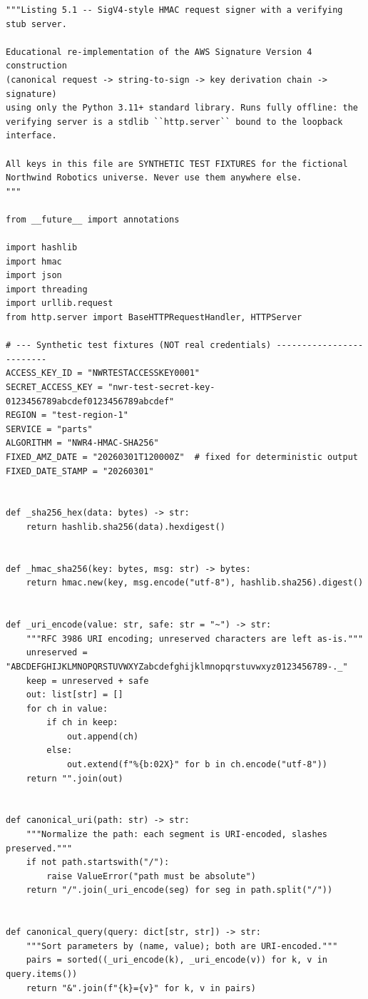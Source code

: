 \begin{verbatim}
"""Listing 5.1 -- SigV4-style HMAC request signer with a verifying stub server.

Educational re-implementation of the AWS Signature Version 4 construction
(canonical request -> string-to-sign -> key derivation chain -> signature)
using only the Python 3.11+ standard library. Runs fully offline: the
verifying server is a stdlib ``http.server`` bound to the loopback
interface.

All keys in this file are SYNTHETIC TEST FIXTURES for the fictional
Northwind Robotics universe. Never use them anywhere else.
"""

from __future__ import annotations

import hashlib
import hmac
import json
import threading
import urllib.request
from http.server import BaseHTTPRequestHandler, HTTPServer

# --- Synthetic test fixtures (NOT real credentials) -------------------------
ACCESS_KEY_ID = "NWRTESTACCESSKEY0001"
SECRET_ACCESS_KEY = "nwr-test-secret-key-0123456789abcdef0123456789abcdef"
REGION = "test-region-1"
SERVICE = "parts"
ALGORITHM = "NWR4-HMAC-SHA256"
FIXED_AMZ_DATE = "20260301T120000Z"  # fixed for deterministic output
FIXED_DATE_STAMP = "20260301"


def _sha256_hex(data: bytes) -> str:
    return hashlib.sha256(data).hexdigest()


def _hmac_sha256(key: bytes, msg: str) -> bytes:
    return hmac.new(key, msg.encode("utf-8"), hashlib.sha256).digest()


def _uri_encode(value: str, safe: str = "~") -> str:
    """RFC 3986 URI encoding; unreserved characters are left as-is."""
    unreserved = "ABCDEFGHIJKLMNOPQRSTUVWXYZabcdefghijklmnopqrstuvwxyz0123456789-._"
    keep = unreserved + safe
    out: list[str] = []
    for ch in value:
        if ch in keep:
            out.append(ch)
        else:
            out.extend(f"%{b:02X}" for b in ch.encode("utf-8"))
    return "".join(out)


def canonical_uri(path: str) -> str:
    """Normalize the path: each segment is URI-encoded, slashes preserved."""
    if not path.startswith("/"):
        raise ValueError("path must be absolute")
    return "/".join(_uri_encode(seg) for seg in path.split("/"))


def canonical_query(query: dict[str, str]) -> str:
    """Sort parameters by (name, value); both are URI-encoded."""
    pairs = sorted((_uri_encode(k), _uri_encode(v)) for k, v in query.items())
    return "&".join(f"{k}={v}" for k, v in pairs)



\end{verbatim}

